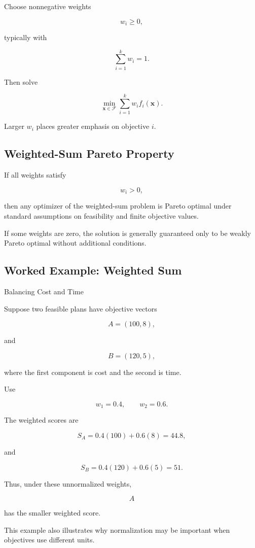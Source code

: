 Choose nonnegative weights

\[
w_i\geq0,
\]

typically with

\[
\boxed{
\sum_{i=1}^{k}
w_i=1.
}
\]

Then solve

\[
\boxed{
\min_{\mathbf{x}\in\mathcal{F}}
\sum_{i=1}^{k}
w_i
f_i(\mathbf{x}).
}
\]

Larger \(w_i\) places greater emphasis on objective \(i\).

\subsection{Weighted-Sum Pareto Property}
\label{subsec:weighted-sum-pareto-property}

If all weights satisfy

\[
\boxed{
w_i>0,
}
\]

then any optimizer of the weighted-sum problem is Pareto optimal under
standard assumptions on feasibility and finite objective values.

If some weights are zero, the solution is generally guaranteed only to be
weakly Pareto optimal without additional conditions.

\subsection{Worked Example: Weighted Sum}
\label{subsec:worked-weighted-sum}

\begin{workedexamplebox}{Balancing Cost and Time}

Suppose two feasible plans have objective vectors

\[
A=(100,8),
\]

and

\[
B=(120,5),
\]

where the first component is cost and the second is time.

Use

\[
w_1=0.4,
\qquad
w_2=0.6.
\]

The weighted scores are

\[
S_A
=
0.4(100)
+
0.6(8)
=
44.8,
\]

and

\[
S_B
=
0.4(120)
+
0.6(5)
=
51.
\]

Thus, under these unnormalized weights,

\begin{answerbox}
\[
\boxed{
A
}
\]

has the smaller weighted score.
\end{answerbox}

This example also illustrates why normalization may be important when
objectives use different units.

\end{workedexamplebox}

